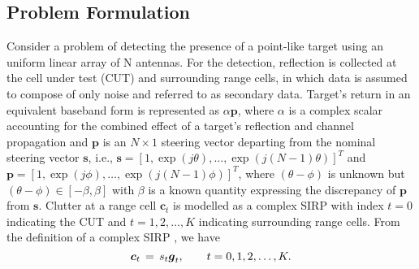
\subsection{Problem Formulation}
Consider a problem of detecting the presence of a point-like target
using an uniform linear array of N antennas.
For the detection, reflection %
is collected at the cell under test (CUT) and surrounding range cells, in which
data is assumed to compose of only noise
and referred to as secondary data.
Target's return
 in an equivalent baseband form
is represented as
$\alpha \boldsymbol{p}$, where $\alpha$ is a complex scalar accounting for the combined effect of
a target's reflection and channel propagation
and $\boldsymbol{p}$ is an $N \times 1$ steering vector departing
from the nominal steering vector $\boldsymbol{s}$,
i.e.,
$\boldsymbol{s} = \left[1,\exp(j\theta),\ldots,\exp(j(N-1)\theta)\right]^T $
and
$\boldsymbol{p} = \left[1,\exp(j\phi),\ldots,\exp(j(N-1)\phi)\right]^T $, 
where
$(\theta - \phi)$ is unknown but 
 $(\theta - \phi) \in [-\beta,\beta]$ with $\beta$
  is a known quantity expressing
  the discrepancy of $\boldsymbol{p}$ from $\boldsymbol{s}$.
Clutter at a range cell $\boldsymbol{c}_t$ is modelled as
a complex SIRP
with index $ t = 0$ indicating the CUT and
$t = 1,2,\ldots,K$ indicating surrounding range cells.
From the definition of a complex SIRP \cite{Conte87}, we have
\begin{equation}\label{noise_model}
      \boldsymbol{c}_t \thinspace=\thinspace s_t \boldsymbol{g}_t, \qquad t = 0,1,2,\ldots, K.
\end{equation}
